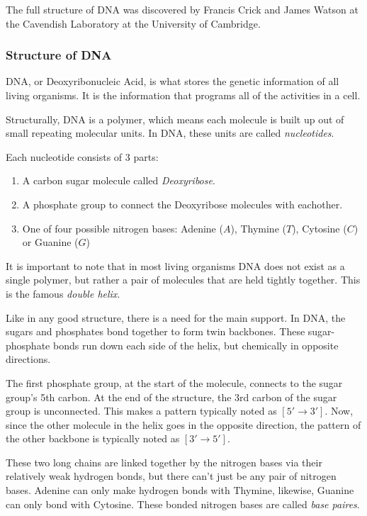 The full structure of DNA was discovered by Francis Crick and James Watson at the Cavendish Laboratory at the University of Cambridge.

\subsubsection{Structure of DNA}

DNA, or Deoxyribonucleic Acid, is what stores the genetic information of all living organisms. It is the information that programs all of the activities in a cell.

Structurally, DNA is a polymer, which means each molecule is built up out of small repeating molecular units. In DNA, these units are called \emph{nucleotides}.

Each nucleotide consists of 3 parts:

\begin{enumerate}
	\item A carbon sugar molecule called \emph{Deoxyribose}. 
	\item A phosphate group to connect the Deoxyribose molecules with eachother. 
	\item One of four possible nitrogen bases: Adenine ($A$), Thymine ($T$), Cytosine ($C$) or Guanine ($G$)
\end{enumerate}

It is important to note that in most living organisms DNA does not exist as a single polymer, but rather a pair of molecules that are held tightly together. This is the famous \emph{double helix}.

Like in any good structure, there is a need for the main support. In DNA, the sugars and phosphates bond together to form twin backbones. These sugar-phosphate bonds run down each side of the helix, but chemically in opposite directions. 

The first phosphate group, at the start of the molecule, connects to the sugar group's 5th carbon. At the end of the structure, the 3rd carbon of the sugar group is unconnected. This makes a pattern typically noted as $[5' \rightarrow 3']$. Now, since the other molecule in the helix goes in the opposite direction, the pattern of the other backbone is typically noted as $[3' \rightarrow 5']$.

These two long chains are linked together by the nitrogen bases via their relatively weak hydrogen bonds, but there can't just be any pair of nitrogen bases. Adenine can only make hydrogen bonds with Thymine, likewise, Guanine can only bond with Cytosine. These bonded nitrogen bases are called \emph{base paires}.

